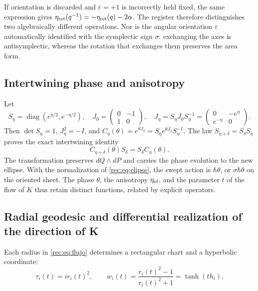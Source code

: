 If orientation is discarded and \(\varepsilon=+1\) is incorrectly held fixed, the same expression gives \(\eta_{\rm ret}(q^{-1})=-\eta_{\rm ret}(q)-2\alpha\). The register therefore distinguishes two algebraically different operations. Nor is the angular orientation \(\varepsilon\) automatically identified with the symplectic sign \(\sigma\): exchanging the axes is antisymplectic, whereas the rotation that exchanges them preserves the area form.

\subsection{Intertwining phase and anisotropy}

Let
\[
 S_\eta=\operatorname{diag}(e^{\eta/2},e^{-\eta/2}),\quad
 J_0=\begin{pmatrix}0&-1\\1&0\end{pmatrix},\quad
 J_\eta=S_\eta J_0S_\eta^{-1}
       =\begin{pmatrix}0&-e^\eta\\e^{-\eta}&0\end{pmatrix}.
\]
Then \(\det S_\eta=1\), \(J_\eta^2=-I\), and
\(C_\eta(\theta)=e^{\theta J_\eta}=S_\eta e^{\theta J_0}S_\eta^{-1}\).
The law \(S_{\eta+\delta}=S_\delta S_\eta\) proves the exact intertwining identity
\begin{equation}
 C_{\eta+\delta}(\theta)S_\delta=S_\delta C_\eta(\theta).
 \label{rec:eq:entrelazamiento}
\end{equation}
The transformation preserves \(dQ\wedge dP\) and carries the phase evolution to the new ellipse. With the normalization of \eqref{rec:eq:elipse}, the swept action is \(\hbar\theta\), or \(\sigma\hbar\theta\) on the oriented sheet. The phase \(\theta\), the anisotropy \(\eta_{\rm el}\), and the parameter \(t\) of the flow of \(K\) thus retain distinct functions, related by explicit operators.

\subsection{Radial geodesic and differential realization of the direction of K}

Each radius in \eqref{rec:eq:flujo} determines a rectangular chart and a hyperbolic coordinate:
\[
 \tau_i(t)=ir_i(t)^2,\qquad
 w_i(t)=\frac{r_i(t)^2-1}{r_i(t)^2+1}=\tanh(th_i).
\]

